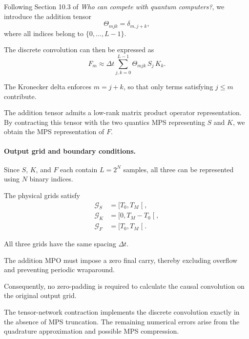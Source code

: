 \documentclass{article}
\begin{document}
Following Section 10.3 of
\textit{Who can compete with quantum computers?},
we introduce the addition tensor
\begin{equation}
    \Theta_{mjk}=\delta_{m,j+k},
\end{equation}
where all indices belong to $\{0,\ldots,L-1\}$.

The discrete convolution can then be expressed as
\begin{equation}
    \boxed{
    F_m \approx \Delta t
    \sum_{j,k=0}^{L-1}
    \Theta_{mjk}\,S_j\,K_k.
    }
\end{equation}

The Kronecker delta enforces $m=j+k$, so that
only terms satisfying $j\leq m$ contribute.

The addition tensor admits a low-rank
matrix product operator representation.
By contracting this tensor with the two
quantics MPS representing $S$ and $K$,
we obtain the MPS representation of $F$.

\paragraph{Output grid and boundary conditions.}

Since $S$, $K$, and $F$ each contain $L=2^N$
samples, all three can be represented
using $N$ binary indices.

The physical grids satisfy
\begin{equation}
    \boxed{
    \begin{aligned}
        \mathcal{G}_S &= \lbrack T_0,T_M\mathclose{\lbrack},\\
        \mathcal{G}_K &= \lbrack 0,T_M-T_0\mathclose{\lbrack},\\
        \mathcal{G}_F &= \lbrack T_0,T_M\mathclose{\lbrack}.
    \end{aligned}
    }
\end{equation}

All three grids have the same spacing $\Delta t$.

The addition MPO must impose a zero
final carry, thereby excluding overflow
and preventing periodic wraparound.

Consequently, no zero-padding is required
to calculate the causal convolution on
the original output grid.

The tensor-network contraction implements
the discrete convolution exactly in the
absence of MPS truncation. The remaining
numerical errors arise from the quadrature
approximation and possible MPS compression.
\end{document}
